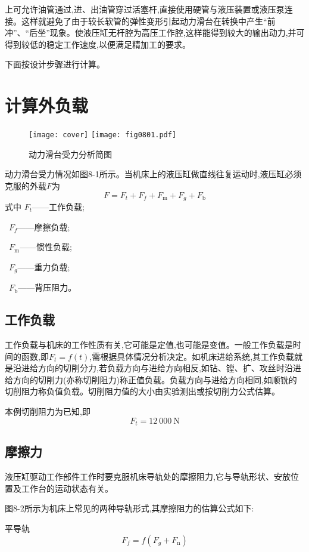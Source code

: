 \noindent 上可允许油管通过,进、出油管穿过活塞杆,直接使用硬管与液压装置或液压泵连接。这样就避免了由于较长软管的弹性变形引起动力滑台在转换中产生“前冲”、“后坐”现象。使液压缸无杆腔为高压工作腔,这样能得到较大的输出动力,并可得到较低的稳定工作速度,以便满足精加工的要求。

下面按设计步骤进行计算。

\section{计算外负载}

\begin{figure}
    \centering
    \ifOpenSource
    \texttt{[image: cover]}
    \else
    \texttt{[image: fig0801.pdf]}
    \fi
    \caption{动力滑台受力分析简图}
    \label{fig:fig0801}
\end{figure}

动力滑台受力情况如图8-1所示。当机床上的液压缸做直线往复运动时,液压缸必须克服的外载$F$为
\begin{equation}
    F=F_t +F_f+F_{\text{m}}+F_g+F_{\text{b}}
\end{equation}
式中
$F_t$——工作负载;

\ $F_f$——摩擦负载;

\ $F_{\text{m}}$——惯性负载;

\ $F_g$——重力负载;

\ $F_{\text{b}}$——背压阻力。

\subsection{工作负载}
工作负载与机床的工作性质有关,它可能是定值,也可能是变值。一般工作负载是时间的函数,即$F_t=f(t)$,需根据具体情况分析决定。如机床进给系统,其工作负载就是沿进给方向的切削分力,若负载方向与进给方向相反,如钻、镗、扩、攻丝时沿进给方向的切削力(亦称切削阻力)称正值负载。负载方向与进给方向相同,如顺铣的切削阻力称负值负载。切削阻力值的大小由实验测出或按切削力公式估算。

本例切削阻力为已知,即$$F_t=12\ 000\ \text{N}$$

\subsection{摩擦力}
液压缸驱动工作部件工作时要克服机床导轨处的摩擦阻力,它与导轨形状、安放位置及工作台的运动状态有关。

图8-2所示为机床上常见的两种导轨形式,其摩擦阻力的估算公式如下:

平导轨
\begin{equation}
    \label{8-2}
    F_f=f(F_g+ F_{\text{n}})
\end{equation}

